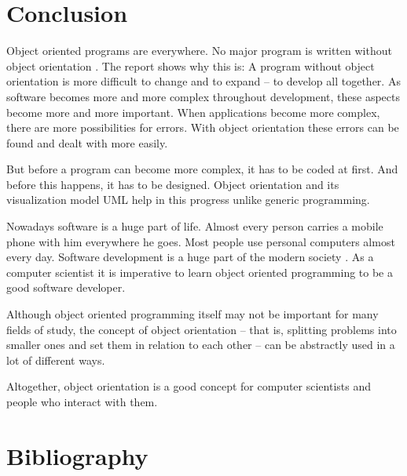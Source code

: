\chapter{Conclusion}

Object oriented programs are everywhere. No major program is written without object orientation \cite{Weisfeld2013ImportanceObjectOriented}. The report shows why this is: A program without object orientation is more difficult to change and to expand -- to develop all together. As software becomes more and more complex throughout development, these aspects become more and more important. When applications become more complex, there are more possibilities for errors. With object orientation these errors can be found and dealt with more easily.

But before a program can become more complex, it has to be coded at first. And before this happens, it has to be designed. Object orientation and its visualization model UML help in this progress unlike generic programming.\medskip

Nowadays software is a huge part of life. Almost every person carries a mobile phone with him everywhere he goes. Most people use personal computers almost every day. Software development is a huge part of the modern society \cite{Demuth2014SoftwaretechnologiefuerEinsteiger}. As a computer scientist it is imperative to learn object oriented programming to be a good software developer. \medskip

Although object oriented programming itself may not be important for many fields of study, the concept of object orientation -- that is, splitting problems into smaller ones and set them in relation to each other -- can be abstractly used in a lot of different ways.\bigskip

Altogether, object orientation is a good concept for computer scientists and people who interact with them.

\chapter*{Bibliography}
\printbibliography[heading=none]
